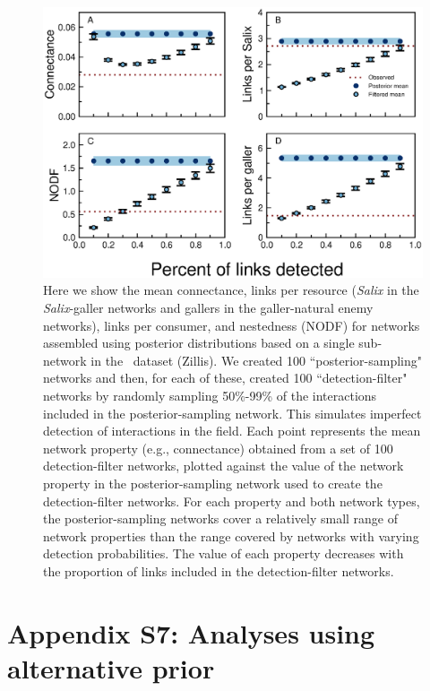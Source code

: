\documentclass[12pt]{article}
\begin{document}
    \begin{figure}[h!]
      \caption{Here we show the mean connectance, links per resource (\emph{Salix} in the \emph{Salix}-galler networks and gallers in the galler-natural enemy networks), links per consumer, and nestedness (NODF) for networks assembled using posterior distributions based on a single sub-network in the~\citet{Kopelke2017} dataset (Zillis). We created 100 ``posterior-sampling" networks and then, for each of these, created 100 ``detection-filter" networks by randomly sampling 50\%-99\% of the interactions included in the posterior-sampling network. This simulates imperfect detection of interactions in the field. Each point represents the mean network property (e.g., connectance) obtained from a set of 100 detection-filter networks, plotted against the value of the network property in the posterior-sampling network used to create the detection-filter networks. For each property and both network types, the posterior-sampling networks cover a relatively small range of network properties than the range covered by networks with varying detection probabilities. The value of each property decreases with the proportion of links included in the detection-filter networks.}
      \label{posterior_webs}    
      \begin{center}
      \includegraphics[width=.9\textwidth]{figures/SG_posterior_properties_Zillis.eps}
      \end{center}
      \end{figure}

\clearpage

\section*{Appendix S7: Analyses using alternative prior}
\end{document}

